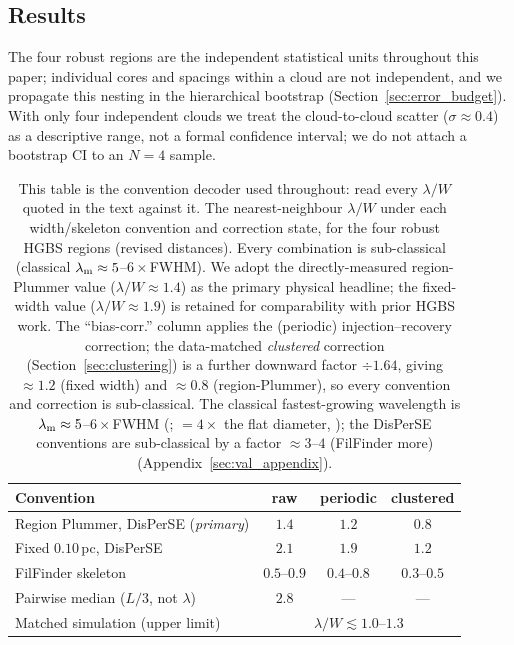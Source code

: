 \documentclass[usenatbib,twoside,twocolumn]{mnras}
\begin{document}
\subsection{Results}

The four robust regions are the independent statistical units throughout this paper; individual cores and spacings within a cloud are not independent, and we propagate this nesting in the hierarchical bootstrap (Section~\ref{sec:error_budget}). With only four independent clouds we treat the cloud-to-cloud scatter ($\sigma\approx0.4$) as a descriptive range, not a formal confidence interval; we do not attach a bootstrap CI to an $N=4$ sample.

\begin{table}
\caption{This table is the convention decoder used throughout: read every $\lambda/W$ quoted in the text against it. The nearest-neighbour $\lambda/W$ under each width/skeleton convention and correction state, for the four robust HGBS regions (revised distances). Every combination is sub-classical (classical $\lambda_{\rm m}\approx5$--$6\times$FWHM). We adopt the directly-measured region-Plummer value ($\lambda/W\approx1.4$) as the primary physical headline; the fixed-width value ($\lambda/W\approx1.9$) is retained for comparability with prior HGBS work. The ``bias-corr.'' column applies the (periodic) injection--recovery correction; the data-matched \emph{clustered} correction (Section~\ref{sec:clustering}) is a further downward factor $\div1.64$, giving $\approx1.2$ (fixed width) and $\approx0.8$ (region-Plummer), so every convention and correction is sub-classical. The classical fastest-growing wavelength is $\lambda_{\rm m}\approx5$--$6\times$FWHM (\citealt{Fischera2012}; $=4\times$ the flat diameter, \citealt{Inutsuka1992}); the DisPerSE conventions are sub-classical by a factor $\approx3$--$4$ (FilFinder more) (Appendix~\ref{sec:val_appendix}).}
\label{tab:headline}
\footnotesize
\setlength{\tabcolsep}{4pt}
\begin{tabular}{p{3.6cm}ccc}
\toprule
Convention & raw & periodic & clustered \\
\midrule
Region Plummer, DisPerSE (\emph{primary}) & $1.4$ & $1.2$ & $0.8$ \\
Fixed $0.10$\,pc, DisPerSE & $2.1$ & $1.9$ & $1.2$ \\
FilFinder skeleton & $0.5$--$0.9$ & $0.4$--$0.8$ & $0.3$--$0.5$ \\
Pairwise median ($L/3$, not $\lambda$) & $2.8$ & --- & --- \\
\midrule
Matched simulation (upper limit) & \multicolumn{3}{c}{$\lambda/W\lesssim1.0$--$1.3$} \\

\end{tabular}
\end{table}
\end{document}
